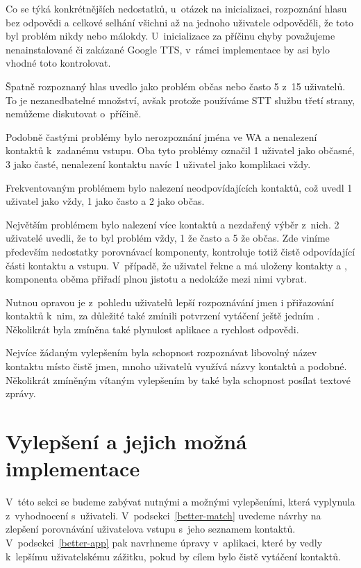Co se týká konkrétnějších nedostatků, u~otázek na inicializaci, rozpoznání
hlasu bez odpovědi a celkové selhání všichni až na jednoho uživatele odpověděli,
že toto byl problém nikdy nebo málokdy. U~inicializace za příčinu
chyby považujeme nenainstalované či zakázané Google TTS, v~rámci
implementace by asi bylo vhodné toto kontrolovat.

Špatně rozpoznaný hlas uvedlo jako problém občas nebo často 5 z~15 uživatelů.
To je nezanedbatelné množství, avšak protože používáme STT službu
třetí strany, nemůžeme diskutovat o~příčině.

Podobně častými problémy bylo nerozpoznání
jména ve WA a nenalezení kontaktů k~zadanému vstupu. Oba
tyto problémy označil 1 uživatel jako občasné, 3 jako časté, nenalezení kontaktu
navíc 1 uživatel jako komplikaci vždy.

Frekventovaným problémem bylo nalezení neodpovídajících kontaktů,
což u\-ve\-dl 1 uživatel jako vždy, 1 jako často a 2 jako občas.

Největším problémem bylo nalezení více kontaktů a nezdařený výběr z~nich.
2 uživatelé uvedli, že to byl problém vždy, 1 že často a 5 že
občas. Zde viníme především nedostatky porovnávací komponenty, kontroluje
totiž čistě odpovídající části kontaktu a vstupu. V~případě, že uživatel
řekne  a má uloženy kontakty  a ,
komponenta oběma přiřadí plnou jistotu a nedokáže mezi nimi vybrat.

Nutnou opravou je z~pohledu uživatelů lepší rozpoznávání jmen i přiřazování
kontaktů k~nim, za důležité také zmínili potvrzení vytáčení ještě jedním
. Několikrát byla zmíněna také plynulost aplikace a rychlost
odpovědi.

Nejvíce žádaným vylepšením byla schopnost rozpoznávat libovolný název kontaktu
místo čistě jmen, mnoho uživatelů využívá názvy kontaktů  a podobné.
Několikrát zmíněným vítaným vylepšením by také byla schopnost posílat textové
zprávy.

\section{Vylepšení a jejich možná implementace}\label{improvements}

V~této sekci se budeme zabývat nutnými a možnými vylepšeními, která
vyplynula z~vyhodnocení s~uživateli. V~podsekci~\ref{better-match}
uvedeme návrhy na zlepšení porovnávání uživatelova vstupu s~jeho
seznamem kontaktů. V~podsekci~\ref{better-app} pak navrhneme
úpravy v~aplikaci, které by vedly k~lepšímu uživatelskému
zážitku, pokud by cílem bylo čistě vytáčení kontaktů.


